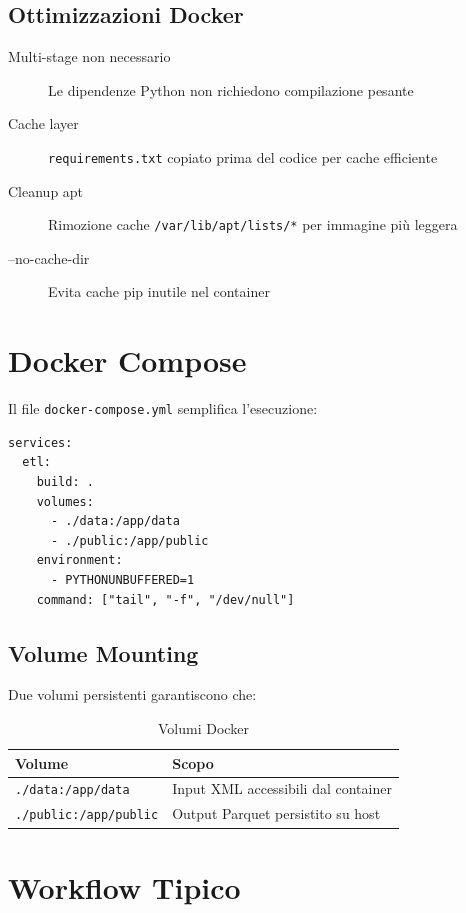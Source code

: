 \subsection{Ottimizzazioni Docker}

\begin{description}
    \item[Multi-stage non necessario] Le dipendenze Python non richiedono compilazione pesante
    \item[Cache layer] \texttt{requirements.txt} copiato prima del codice per cache efficiente
    \item[Cleanup apt] Rimozione cache \texttt{/var/lib/apt/lists/*} per immagine più leggera
    \item[--no-cache-dir] Evita cache pip inutile nel container
\end{description}

\section{Docker Compose}

Il file \texttt{docker-compose.yml} semplifica l'esecuzione:

\begin{lstlisting}[language=docker, caption=docker-compose.yml]
services:
  etl:
    build: .
    volumes:
      - ./data:/app/data
      - ./public:/app/public
    environment:
      - PYTHONUNBUFFERED=1
    command: ["tail", "-f", "/dev/null"]
\end{lstlisting}

\subsection{Volume Mounting}

Due volumi persistenti garantiscono che:

\begin{table}[h]
\centering
\begin{tabular}{@{}lp{8cm}@{}}
\toprule
\textbf{Volume} & \textbf{Scopo} \\
\midrule
\texttt{./data:/app/data} & Input XML accessibili dal container \\
\texttt{./public:/app/public} & Output Parquet persistito su host \\
\bottomrule
\end{tabular}
\caption{Volumi Docker}
\end{table}

\section{Workflow Tipico}

